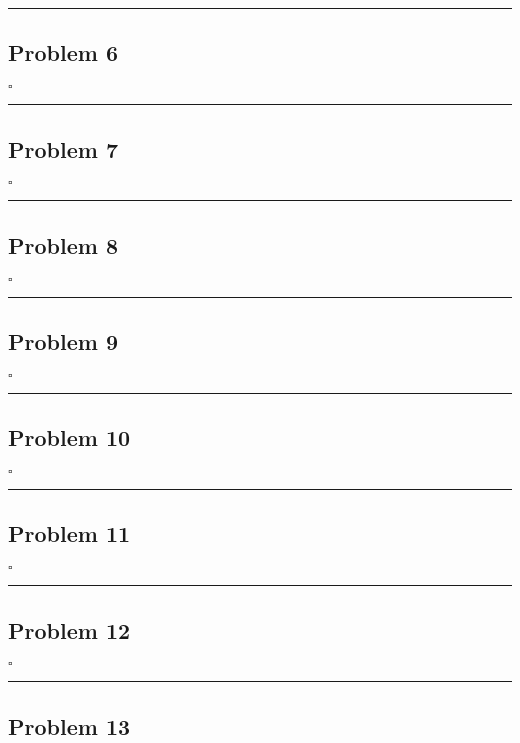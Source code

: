 \documentclass[12pt]{article}
\newcommand*{\QEDB}{\hfill\ensuremath{\square}}
\newcommand{\horrule}[1]{\rule{\linewidth}{#1}}
\begin{document}
\horrule{0.5pt}

\subsection*{Problem 6}



\QEDB

\horrule{0.5pt}

\subsection*{Problem 7}

\QEDB

\horrule{0.5pt}

\subsection*{Problem 8}

\QEDB

\horrule{0.5pt}

\subsection*{Problem 9}

\QEDB

\horrule{0.5pt}

\subsection*{Problem 10}

\QEDB

\horrule{0.5pt}

\subsection*{Problem 11}

\QEDB

\horrule{0.5pt}

\subsection*{Problem 12}

\QEDB

\horrule{0.5pt}

\subsection*{Problem 13}
\end{document}

